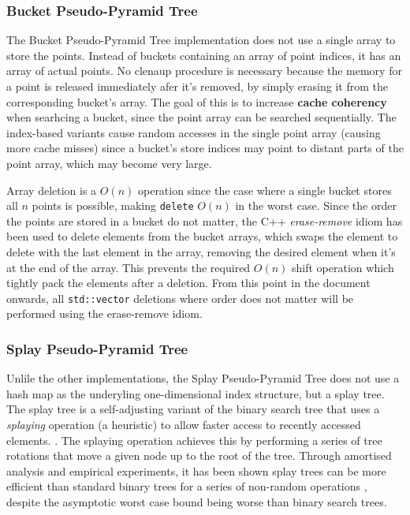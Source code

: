 \subsubsection{Bucket Pseudo-Pyramid Tree}

The Bucket Pseudo-Pyramid Tree implementation does not use a single array to store the points. Instead of buckets containing an array of point indices, it has an array of actual points. No clenaup procedure is necessary because the memory for a point is released immediately afer it's removed, by simply erasing it from the corresponding bucket's array. The goal of this is to increase \textbf{cache coherency} when searhcing a bucket, since the point array can be searched sequentially. The index-based variants cause random accesses in the single point array (causing more cache misses) since a bucket's store indices may point to distant parts of the point array, which may become very large.


Array deletion is a $O(n)$ operation since the case where a single bucket stores all $n$ points is possible, making \texttt{delete} $O(n)$ in the worst case. Since the order the points are stored in a bucket do not matter, the C++ \textit{erase-remove} idiom has been used to delete elements from the bucket arrays, which swaps the element to delete with the last element in the array, removing the desired element when it's at the end of the array. This prevents the required $O(n)$ shift operation which tightly pack the elements after a deletion. From this point in the document onwards, all \texttt{std::vector} deletions where order does not matter will be performed using the erase-remove idiom.

\subsubsection{Splay Pseudo-Pyramid Tree}

Unlile the other implementations, the Splay Pseudo-Pyramid Tree does not use a hash map as the underyling one-dimensional index structure, but a splay tree. The splay tree is a self-adjusting variant of the binary search tree that uses a \textit{splaying} operation (a heuristic) to allow faster access to recently accessed elements. \cite{splay-tree}. The splaying operation achieves this by performing a series of tree rotations that move a given node up to the root of the tree. Through amortised analysis and empirical experiments, it has been shown splay trees can be more efficient than standard binary trees for a series of non-random operations \cite{splay-tree}, despite the asymptotic worst case bound being worse than binary search trees.

